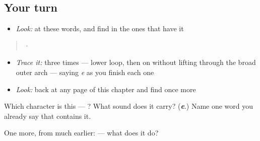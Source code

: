 \subsection*{Your turn}
\begin{itemize}
\raggedright
  \item \emph{Look:} at these words, and find  in the ones that have it
\end{itemize}

\begin{quote}
  ·  
\end{quote}

\begin{itemize}
\raggedright
  \item \emph{Trace it:}  three times — lower loop, then on without lifting through the broad outer arch — saying \emph{e} as you finish each one
  \item \emph{Look:} back at any page of this chapter and find  once more
\end{itemize}

\begin{tcolorbox}[breakable,colback=teal!4,colframe=teal!35!black,title={Before you move on}]
Which character is this — ? What sound does it carry? (\emph{\textbf{e}}.) Name one word you already say that contains it.

One more, from much earlier:  — what does it do?
\end{tcolorbox}
